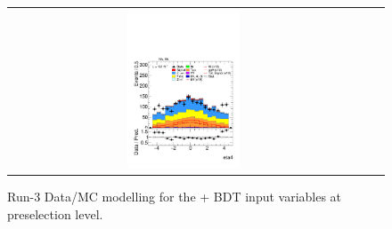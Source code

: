\begin{figure}[htbp]
\begin{tabular}{@{}c c c@{}}
    \includegraphics[width=0.33\textwidth]{images/plots_modelling_run2_run3_variables/run_3_tth/plot_eta4_hh_tth_22_23_24.pdf}
  \end{tabular}

  \caption{Run-3 Data/MC modelling for the \thqb + \ttH BDT input variables at preselection level.}
  \label{tth_vars_modelling_run3_1}
\end{figure}

